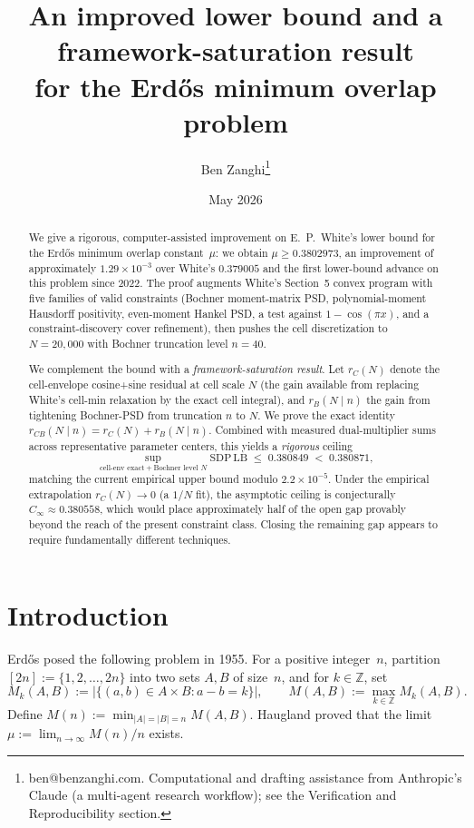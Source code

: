 \documentclass[11pt]{article}
\title{An improved lower bound and a framework-saturation result\\
for the Erd\H{o}s minimum overlap problem}
\author{Ben Zanghi\thanks{ben@benzanghi.com. Computational and drafting
assistance from Anthropic's Claude (a multi-agent research workflow);
see the Verification and Reproducibility section.}}
\date{May 2026}
\theoremstyle{plain}
\theoremstyle{definition}
\begin{document}
\maketitle

\begin{abstract}
We give a rigorous, computer-assisted improvement on E.~P.~White's
\cite{White2023} lower bound for the Erd\H{o}s minimum overlap
constant~$\mu$: we obtain $\mu \ge 0.3802973$, an improvement of
approximately $1.29 \times 10^{-3}$ over White's $0.379005$ and the
first lower-bound advance on this problem since 2022. The proof
augments White's Section~5 convex program with five families of valid
constraints (Bochner moment-matrix PSD, polynomial-moment Hausdorff
positivity, even-moment Hankel PSD, a test against $1-\cos(\pi x)$, and
a constraint-discovery cover refinement), then pushes the cell
discretization to $N=20{,}000$ with Bochner truncation level $n=40$.

We complement the bound with a \emph{framework-saturation result}.
Let $r_C(N)$ denote the cell-envelope cosine+sine residual at cell
scale $N$ (the gain available from replacing White's cell-min
relaxation by the exact cell integral), and $r_B(N \mid n)$ the gain
from tightening Bochner-PSD from truncation $n$ to $N$. We prove the
exact identity $r_{CB}(N \mid n) = r_C(N) + r_B(N \mid n)$. Combined
with measured dual-multiplier sums across representative parameter
centers, this yields a \emph{rigorous} ceiling
\[
\sup_{\text{cell-env exact} + \text{Bochner level }N} \mathrm{SDP\,LB}
\;\le\; 0.380849 \;<\; 0.380871,
\]
matching the current empirical upper bound modulo $2.2 \times 10^{-5}$.
Under the empirical extrapolation $r_C(N) \to 0$ (a $1/N$ fit), the
asymptotic ceiling is conjecturally $C_\infty \approx 0.380558$,
which would place approximately half of the open gap provably beyond
the reach of the present constraint class. Closing the remaining gap
appears to require fundamentally different techniques.
\end{abstract}

\section{Introduction}

Erd\H{o}s \cite{Erdos1955} posed the following problem in 1955. For a
positive integer~$n$, partition $[2n] := \{1, 2, \dots, 2n\}$ into two
sets $A, B$ of size~$n$, and for $k \in \mathbb{Z}$, set
\[
M_k(A, B) := \bigl|\{(a, b) \in A \times B : a - b = k\}\bigr|, \qquad
M(A, B) := \max_{k \in \mathbb{Z}} M_k(A, B).
\]
Define $M(n) := \min_{|A| = |B| = n} M(A, B)$. Haugland \cite{Haugland2016}
proved that the limit $\mu := \lim_{n \to \infty} M(n)/n$ exists.
\end{document}
